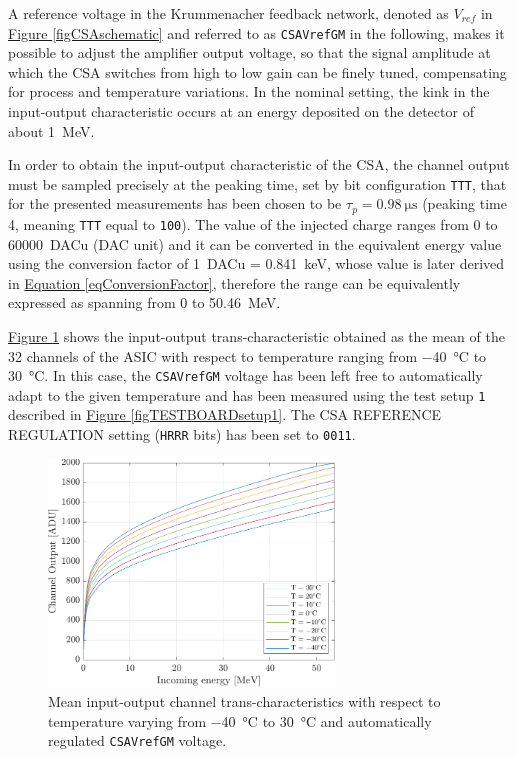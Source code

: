 \par
A reference voltage in the Krummenacher feedback network, denoted as $V_{ref}$ in \hyperref[figCSAschematic]{Figure \ref{figCSAschematic}} and referred to as \texttt{CSAVrefGM} in the following, makes it possible to adjust the amplifier output voltage, so that the signal amplitude at which the CSA switches from high to low gain can be finely tuned, compensating for process and temperature variations. In the nominal setting, the kink in the input-output characteristic occurs at an energy deposited on the detector of about \SI{1}{\mega\electronvolt}.

\par
In order to obtain the input-output characteristic of the CSA, the channel output must be sampled precisely at the peaking time, set by bit configuration \texttt{TTT}, that for the presented measurements has been chosen to be $\tau_{p} = \SI{0.98}{\micro\second}$ (peaking time 4, meaning \texttt{TTT} equal to \texttt{100}). The value of the injected charge ranges from 0 to \SI{60000}{DACu} (DAC unit) and it can be converted in the equivalent energy value using the conversion factor of \SI{1}{DACu} = \SI{0.841}{\kilo\electronvolt}, whose value is later derived in \hyperref[eqConversionFactor]{Equation \ref{eqConversionFactor}}, therefore the range can be equivalently expressed as spanning from 0 to \SI{50.46}{\mega\electronvolt}.

\par
\hyperref[figFDTplotauto0011]{Figure \ref{figFDTplotauto0011}} shows the input-output trans-characteristic obtained as the mean of the 32 channels of the ASIC with respect to temperature ranging from \SI{-40}{\celsius} to \SI{30}{\celsius}. In this case, the \texttt{CSAVrefGM} voltage has been left free to automatically adapt to the given temperature and has been measured using the test setup \texttt{1} described in \hyperref[figTESTBOARDsetup1]{Figure \ref{figTESTBOARDsetup1}}. The CSA REFERENCE REGULATION setting (\texttt{HRRR} bits) has been set to \texttt{0011}.

\begin{figure}[h!]
    \centering
    \includegraphics[width=0.68\textwidth]{Images/chap1/results/FDT/fdt_csavrefgm_auto_tau6_keV_0011.pdf}
    \caption{Mean input-output channel trans-characteristics with respect to temperature varying from \SI{-40}{\celsius} to \SI{30}{\celsius} and automatically regulated \texttt{CSAVrefGM} voltage.}
    \label{figFDTplotauto0011}
\end{figure}

